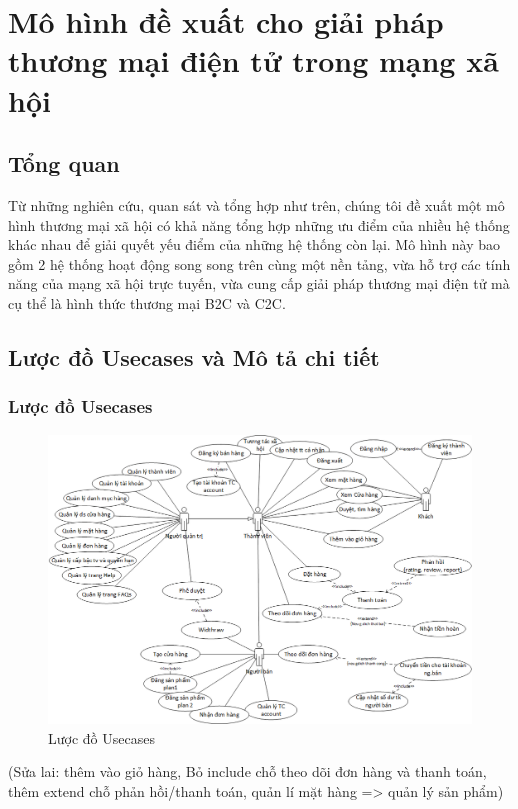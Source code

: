 \chapter{Mô hình đề xuất cho giải pháp thương mại điện tử trong mạng xã hội}

\section{Tổng quan}

Từ những nghiên cứu, quan sát và tổng hợp như trên, chúng tôi đề xuất một mô hình thương mại xã hội có khả năng tổng hợp những ưu điểm của nhiều hệ thống khác nhau để giải quyết yếu điểm của những hệ thống còn lại. Mô hình này bao gồm 2 hệ thống hoạt động song song trên cùng một nền tảng, vừa hỗ trợ các tính năng của mạng xã hội trực tuyến, vừa cung cấp giải pháp thương mại điện tử mà cụ thể là hình thức thương mại B2C và C2C.



\section{Lược đồ Usecases và Mô tả chi tiết}
\subsection{Lược đồ Usecases}

\begin{figure}[H]
	\centering
	\includegraphics[width=1\textwidth]{img/usecase-diagram.PNG} 
	\caption{Lược đồ Usecases}
\end{figure}
(Sửa lai: thêm vào giỏ hàng, Bỏ include chỗ theo dõi đơn hàng và thanh toán, thêm extend chỗ phản hồi/thanh toán, quản lí mặt hàng => quản lý sản phẩm)

